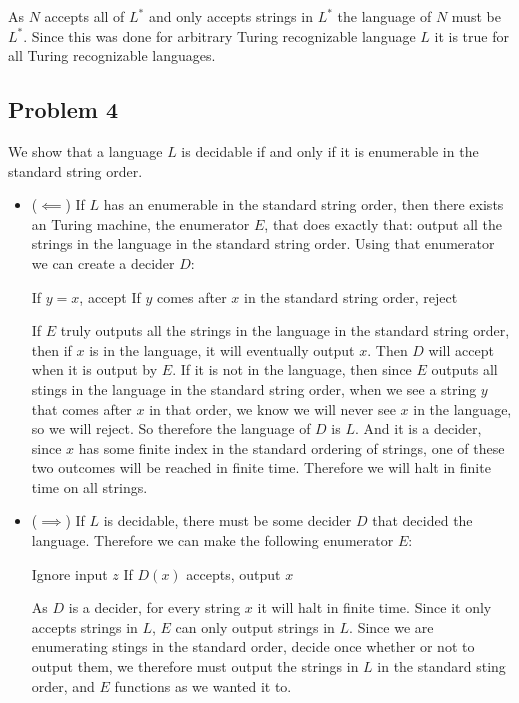 \documentclass[english]{article}
\begin{document}
As $N$ accepts all of $L^*$ and only accepts strings in $L^*$ the language
of $N$ must be $L^*$. Since this was done for arbitrary Turing recognizable
language $L$ it is true for all Turing recognizable languages.

\subsection*{Problem 4}
We show that a language $L$ is decidable if and only if it is enumerable in
the standard string order.
\begin{itemize}
\item ($ \impliedby $) If $L$ has an enumerable in the standard string
order, then there exists an Turing machine, the enumerator $E$, that
does exactly that: output all the strings in the language in the standard
string order. Using that enumerator we can create a decider $D$:
\begin{algorithmic}
		\State If $y = x$, accept
		\State If $y$ comes after $x$ in the standard string order, reject
	\EndFor
\EndFunction
\end{algorithmic}

If $E$ truly outputs all the strings in the language in the standard string
order, then if $x$ is in the language, it will eventually output $x$. Then
$D$ will accept when it is output by $E$. If it is not in the language, then
since $E$ outputs all stings in the language in the standard string order,
when we see a string $y$ that comes after $x$ in that order, we know we will
never see $x$ in the language, so we will reject. So therefore the language
of $D$ is $L$. And it is a decider, since $x$ has some finite
index in the standard ordering of strings, one of these two outcomes will
be reached in finite time. Therefore we will halt in finite time on all
strings.

\item ($ \implies $) If $L$ is decidable, there must be some decider $D$
that decided the language. Therefore we can make the following enumerator
$E$:
\begin{algorithmic}
	\State Ignore input $z$
		\State If $D(x)$ accepts, output $x$
	\EndFor
\EndFunction
\end{algorithmic}

As $D$ is a decider, for every string $x$ it will halt in finite time.
Since it only accepts strings in $L$, $E$ can only output strings in $L$.
Since we are enumerating stings in the standard order, decide once 
whether or not to output them, we therefore must output the strings in
$L$ in the standard sting order, and $E$ functions as we wanted it to.

\end{itemize}
\end{document}
